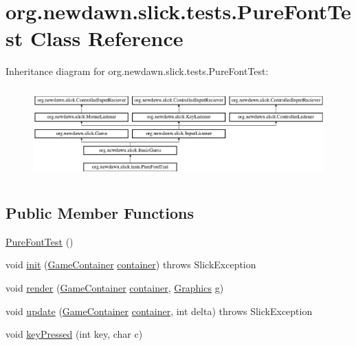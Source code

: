 \hypertarget{classorg_1_1newdawn_1_1slick_1_1tests_1_1_pure_font_test}{}\section{org.\+newdawn.\+slick.\+tests.\+Pure\+Font\+Test Class Reference}
\label{classorg_1_1newdawn_1_1slick_1_1tests_1_1_pure_font_test}
Inheritance diagram for org.\+newdawn.\+slick.\+tests.\+Pure\+Font\+Test\+:\begin{figure}[H]
\begin{center}
\leavevmode
\includegraphics[height=3.522012cm]{classorg_1_1newdawn_1_1slick_1_1tests_1_1_pure_font_test}
\end{center}
\end{figure}
\subsection*{Public Member Functions}
\begin{DoxyCompactItemize}
\item 
\mbox{\hyperlink{classorg_1_1newdawn_1_1slick_1_1tests_1_1_pure_font_test_a13e63fb95747ce5891d5e790446988d0}{Pure\+Font\+Test}} ()
\item 
void \mbox{\hyperlink{classorg_1_1newdawn_1_1slick_1_1tests_1_1_pure_font_test_a0b2030d353fc6c81925f6ce6e583c62c}{init}} (\mbox{\hyperlink{classorg_1_1newdawn_1_1slick_1_1_game_container}{Game\+Container}} \mbox{\hyperlink{classorg_1_1newdawn_1_1slick_1_1tests_1_1_pure_font_test_afb97856ff89ea6b4957e845fcba255fe}{container}})  throws Slick\+Exception 
\item 
void \mbox{\hyperlink{classorg_1_1newdawn_1_1slick_1_1tests_1_1_pure_font_test_a2a5d9e4f0b8dc1a768304c9747cede17}{render}} (\mbox{\hyperlink{classorg_1_1newdawn_1_1slick_1_1_game_container}{Game\+Container}} \mbox{\hyperlink{classorg_1_1newdawn_1_1slick_1_1tests_1_1_pure_font_test_afb97856ff89ea6b4957e845fcba255fe}{container}}, \mbox{\hyperlink{classorg_1_1newdawn_1_1slick_1_1_graphics}{Graphics}} g)
\item 
void \mbox{\hyperlink{classorg_1_1newdawn_1_1slick_1_1tests_1_1_pure_font_test_a87f85cc4bba2ae7c3ffdcdd62a8c387a}{update}} (\mbox{\hyperlink{classorg_1_1newdawn_1_1slick_1_1_game_container}{Game\+Container}} \mbox{\hyperlink{classorg_1_1newdawn_1_1slick_1_1tests_1_1_pure_font_test_afb97856ff89ea6b4957e845fcba255fe}{container}}, int delta)  throws Slick\+Exception 
\item 
void \mbox{\hyperlink{classorg_1_1newdawn_1_1slick_1_1tests_1_1_pure_font_test_adec56bd90adaf27d114e39cbb6b3c17b}{key\+Pressed}} (int key, char c)
\end{DoxyCompactItemize}
